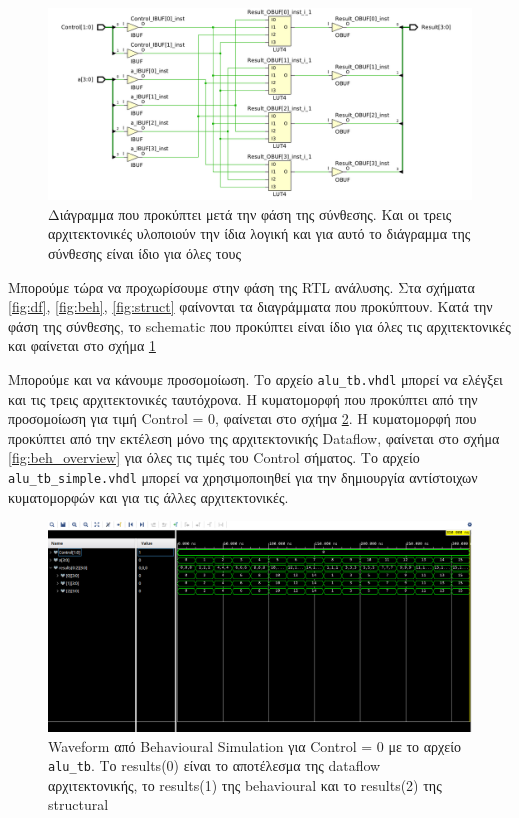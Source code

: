 \documentclass[11pt, a4paper]{report}
\begin{document}
\begin{figure}
  \includegraphics[width=\textwidth]{./images/alu-2/Synth_Schem_ALU_2.png}
  \caption{Διάγραμμα που προκύπτει μετά την φάση της σύνθεσης. Και οι τρεις αρχιτεκτονικές υλοποιούν την ίδια λογική και για αυτό το διάγραμμα της σύνθεσης είναι ίδιο για όλες τους}
  \label{fig:synth}
\end{figure}

Μπορούμε τώρα να προχωρίσουμε στην φάση της RTL ανάλυσης. Στα σχήματα \ref{fig:df}, \ref{fig:beh}, \ref{fig:struct} φαίνονται τα διαγράμματα που προκύπτουν.
Κατά την φάση της σύνθεσης, το schematic που προκύπτει είναι ίδιο για όλες τις αρχιτεκτονικές και φαίνεται στο σχήμα \ref{fig:synth}

Μπορούμε και να κάνουμε προσομοίωση. Το αρχείο \texttt{alu_tb.vhdl} μπορεί να ελέγξει και τις τρεις αρχιτεκτονικές ταυτόχρονα.
Η κυματομορφή που προκύπτει από την προσομοίωση για τιμή Control = 0, φαίνεται στο σχήμα \ref{fig:beh_wfm_0}. 
Η κυματομορφή που προκύπτει από την εκτέλεση μόνο της αρχιτεκτονικής Dataflow, φαίνεται στο σχήμα \ref{fig:beh_overview} για όλες τις τιμές του Control σήματος.
Το αρχείο \texttt{alu_tb_simple.vhdl} μπορεί να χρησιμοποιηθεί για την δημιουργία αντίστοιχων κυματομορφών και για τις άλλες αρχιτεκτονικές.

\begin{figure}
  \includegraphics[width=\textwidth]{./images/alu-2/beh-sim-0.png}
  \caption{Waveform από Behavioural Simulation για Control = 0 με το αρχείο \texttt{alu_tb}. Το results(0) είναι το αποτέλεσμα της dataflow αρχιτεκτονικής, το results(1) της behavioural και το results(2) της structural}
  \label{fig:beh_wfm_0}
\end{figure}
\end{document}
